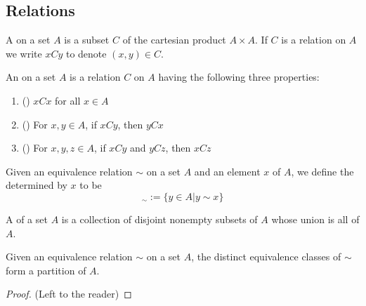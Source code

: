 \documentclass[12pt, a4paper, oneside, openright, titlepage]{book}
\begin{document}
\begin{appendices}
	\section{Relations}
    
    \begin{defn}[Relation]
        A  on a set $A$ is a subset $C$ of the cartesian product $A \times A$. If $C$ is a relation on $A$ we write $xCy$ to denote $(x,y) \in C$.
    \end{defn}
    

    \begin{defn}
        An  on a set $A$ is a relation $C$ on $A$ having the following three properties: \begin{enumerate}
            \item () $xCx$ for all $x \in A$
            \item () For $x,y \in A$, if $xCy$, then $yCx$
            \item () For $x,y,z \in A$, if $xCy$ and $yCz$, then $xCz$
        \end{enumerate}
    \end{defn}


    \begin{defn}
        Given an equivalence relation $\sim$ on a set $A$ and an element $x$ of $A$, we define the  determined by $x$ to be \begin{equation}
            [x]_{\sim} := \{y \in A\vert y\sim x\}
        \end{equation}
    \end{defn}


    \begin{defn}[Partition]
        A  of a set $A$ is a collection of disjoint nonempty subsets of $A$ whose union is all of $A$.
    \end{defn}



    \begin{prop}
        Given an equivalence relation $\sim$ on a set $A$, the distinct equivalence classes of $\sim$ form a partition of $A$.
    \end{prop}
    \begin{proof}
        (Left to the reader)
    \end{proof}


\end{appendices}
\end{document}
